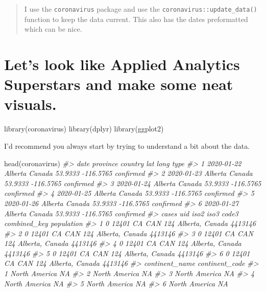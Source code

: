 \documentclass[
]{book}
\newenvironment{Shaded}{\begin{snugshade}}{\end{snugshade}}
\newcommand{\CommentTok}[1]{\textcolor[rgb]{0.56,0.35,0.01}{\textit{#1}}}
\newcommand{\FunctionTok}[1]{\textcolor[rgb]{0.00,0.00,0.00}{#1}}
\newcommand{\NormalTok}[1]{#1}
\begin{document}
\begin{quote}
I use the \texttt{coronavirus} package and use the \texttt{coronavirus::update\_data()} function to keep the data current. This also has the dates preformatted which can be nice.
\end{quote}

\hypertarget{lets-look-like-applied-analytics-superstars-and-make-some-neat-visuals.}{%
\section{Let's look like Applied Analytics Superstars and make some neat visuals.}\label{lets-look-like-applied-analytics-superstars-and-make-some-neat-visuals.}}

\begin{Shaded}
\begin{Highlighting}[]
\FunctionTok{library}\NormalTok{(coronavirus)}
\FunctionTok{library}\NormalTok{(dplyr)}
\FunctionTok{library}\NormalTok{(ggplot2)}
\end{Highlighting}
\end{Shaded}

I'd recommend you always start by trying to understand a bit about the data.

\begin{Shaded}
\begin{Highlighting}[]
\FunctionTok{head}\NormalTok{(coronavirus)}
\CommentTok{\#\textgreater{}         date province country     lat      long      type}
\CommentTok{\#\textgreater{} 1 2020{-}01{-}22  Alberta  Canada 53.9333 {-}116.5765 confirmed}
\CommentTok{\#\textgreater{} 2 2020{-}01{-}23  Alberta  Canada 53.9333 {-}116.5765 confirmed}
\CommentTok{\#\textgreater{} 3 2020{-}01{-}24  Alberta  Canada 53.9333 {-}116.5765 confirmed}
\CommentTok{\#\textgreater{} 4 2020{-}01{-}25  Alberta  Canada 53.9333 {-}116.5765 confirmed}
\CommentTok{\#\textgreater{} 5 2020{-}01{-}26  Alberta  Canada 53.9333 {-}116.5765 confirmed}
\CommentTok{\#\textgreater{} 6 2020{-}01{-}27  Alberta  Canada 53.9333 {-}116.5765 confirmed}
\CommentTok{\#\textgreater{}   cases   uid iso2 iso3 code3    combined\_key population}
\CommentTok{\#\textgreater{} 1     0 12401   CA  CAN   124 Alberta, Canada    4413146}
\CommentTok{\#\textgreater{} 2     0 12401   CA  CAN   124 Alberta, Canada    4413146}
\CommentTok{\#\textgreater{} 3     0 12401   CA  CAN   124 Alberta, Canada    4413146}
\CommentTok{\#\textgreater{} 4     0 12401   CA  CAN   124 Alberta, Canada    4413146}
\CommentTok{\#\textgreater{} 5     0 12401   CA  CAN   124 Alberta, Canada    4413146}
\CommentTok{\#\textgreater{} 6     0 12401   CA  CAN   124 Alberta, Canada    4413146}
\CommentTok{\#\textgreater{}   continent\_name continent\_code}
\CommentTok{\#\textgreater{} 1  North America             NA}
\CommentTok{\#\textgreater{} 2  North America             NA}
\CommentTok{\#\textgreater{} 3  North America             NA}
\CommentTok{\#\textgreater{} 4  North America             NA}
\CommentTok{\#\textgreater{} 5  North America             NA}
\CommentTok{\#\textgreater{} 6  North America             NA}
\end{Highlighting}
\end{Shaded}
\end{document}
